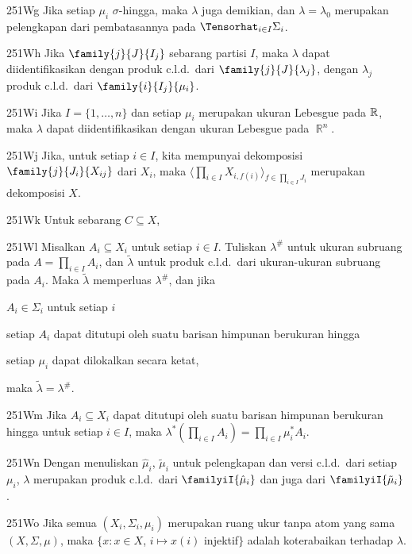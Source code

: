 \spheader 251Wg Jika setiap $\mu_i$ $\sigma$-hingga, maka $\lambda$ juga demikian, dan
$\lambda=\lambda_0$ merupakan pelengkapan dari pembatasannya pada
$\Tensorhat_{i\in I}\Sigma_i$.

\spheader 251Wh Jika $\family{j}{J}{I_j}$ sebarang partisi $I$, maka
$\lambda$ dapat diidentifikasikan dengan produk c.l.d.\ dari
$\family{j}{J}{\lambda_j}$, dengan $\lambda_j$ produk c.l.d.\ dari
$\family{i}{I_j}{\mu_i}$. 

\spheader 251Wi Jika $I=\{1,\ldots,n\}$ dan setiap $\mu_i$ merupakan ukuran Lebesgue
pada $\Bbb R$, maka $\lambda$ dapat diidentifikasikan dengan ukuran Lebesgue
pada $\BbbR^n$.

\spheader 251Wj Jika, untuk setiap $i\in I$, kita mempunyai dekomposisi
$\family{j}{J_i}{X_{ij}}$ dari $X_i$, maka
$\langle\prod_{i\in I}X_{i,f(i)}\rangle_{f\in\prod_{i\in I}J_i}$ merupakan
dekomposisi $X$.

\spheader 251Wk Untuk sebarang $C\subseteq X$,


\spheader 251Wl Misalkan $A_i\subseteq X_i$ untuk setiap $i\in I$.
Tuliskan $\lambda^{\#}$ untuk ukuran subruang pada $A=\prod_{i\in I}A_i$,
dan $\tilde\lambda$ untuk produk c.l.d.\ dari ukuran-ukuran subruang pada
$A_i$. Maka $\tilde\lambda$ memperluas $\lambda^{\#}$, dan jika

 $A_i\in\Sigma_i$ untuk setiap $i$

 setiap $A_i$ dapat ditutupi oleh suatu barisan himpunan berukuran
hingga

 setiap $\mu_i$ dapat dilokalkan secara ketat,

\noindent maka $\tilde\lambda=\lambda^{\#}$.

\spheader 251Wm Jika $A_i\subseteq X_i$ dapat ditutupi oleh suatu barisan
himpunan berukuran hingga untuk setiap $i\in I$, maka
$\lambda^*(\prod_{i\in I}A_i)=\prod_{i\in I}\mu_i^*A_i$.

\spheader 251Wn Dengan menuliskan $\hat\mu_i$, $\tilde\mu_i$ untuk pelengkapan
dan versi c.l.d.\ dari setiap $\mu_i$, $\lambda$ merupakan produk c.l.d.\ dari
$\familyiI{\hat\mu_i}$ dan juga dari $\familyiI{\tilde\mu_i}$.

\spheader 251Wo Jika semua $(X_i,\Sigma_i,\mu_i)$ merupakan ruang ukur tanpa atom
yang sama $(X,\Sigma,\mu)$, maka
$\{x:x\in X$, $i\mapsto x(i)$ injektif$\}$ adalah
koterabaikan terhadap $\lambda$.

